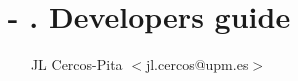 \documentclass[a4paper,12pt]{book}
\author{JL Cercos-Pita $<$jl.cercos@upm.es$>$}
\title{\vspace{-2em}
\NAME- \VERSION.\rcc
\textbf{Developers guide}}
\date{\today\\[4.0 in]
\begin{figure}[h!]
  \centering
  \texttt{[image: CC\_88x31]}
\end{figure}
}
\begin{document}
\maketitle
\thispagestyle{empty}
%
\newpage
\tableofcontents
\newpage
\newpage





\begin{appendices}

\end{appendices}

% 
\end{document}
